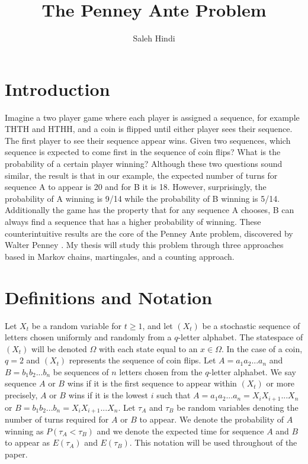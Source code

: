 \documentclass{article}
\numberwithin{mytheorem}{subsection} %
\begin{document}
	\title{The Penney Ante Problem}
	\author{Saleh Hindi}

	\maketitle

	\section{Introduction}
		Imagine a two player game where
		each player is assigned a sequence, for example THTH and HTHH, and a coin is flipped until either player sees their sequence.
		The first player to see their sequence appear wins.
		Given two sequences, which sequence is expected to come first in the
		sequence of coin flips? What is the probability of a certain player winning? Although these two
		questions sound similar, the result is that in our example,
		the expected number of turns for sequence A to appear is 20 and for B it is 18. However, surprisingly, the probability
		of A winning is 9/14 while the probability of B winning is 5/14. Additionally the game has the property
		that for any sequence A chooses, B can always find a sequence that has a higher probability of winning.
		These counterintuitive results are the core of the Penney Ante problem, discovered by Walter Penney
		\cite{gardner}. My thesis will study this problem through three approaches based in Markov chains, martingales,
		and a counting approach.

	\section{Definitions and Notation}
		Let $X_t$ be a random variable for $t \geq 1$, and let $(X_t)$ be a stochastic sequence of letters chosen uniformly and
		randomly from a $q$-letter alphabet. The statespace of $(X_t)$ will be denoted $\Omega$ with each state equal to an $x \in \Omega$. In the case of a coin, $q=2$ and $(X_t)$ represents the sequence of coin flips. Let $A=a_1a_2...a_n$ and $B=b_1b_2...b_n$ be sequences
		of $n$ letters chosen from the $q$-letter alphabet. We say
		sequence $A$ or $B$ wins if it is the first sequence to appear within $(X_t)$ or more precisely, $A$ or $B$ wins if it is the lowest $i$ such that $A = a_1a_2...a_n = X_iX_{i+1}...X_n$ or $B = b_1b_2...b_n = X_iX_{i+1}...X_n$. Let $\tau_A$ and $\tau_B$ be random variables denoting
		the number of turns required for $A$ or $B$ to appear. We denote
		the probability of $A$ winning as $P(\tau_A < \tau_B)$ and we denote the expected time for sequence
		$A$ and $B$ to appear as $E(\tau_A)$ and $E(\tau_B)$. This notation will be used throughout of the paper. 
\end{document}
